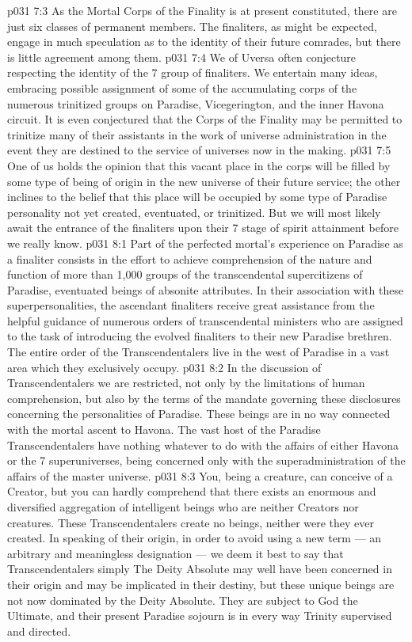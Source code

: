 \vs p031 7:3 \pc As the Mortal Corps of the Finality is at present constituted, there are just six classes of permanent members. The finaliters, as might be expected, engage in much speculation as to the identity of their future comrades, but there is little agreement among them.
\vs p031 7:4 We of Uversa often conjecture respecting the identity of the 7 group of finaliters. We entertain many ideas, embracing possible assignment of some of the accumulating corps of the numerous trinitized groups on Paradise, Vicegerington, and the inner Havona circuit. It is even conjectured that the Corps of the Finality may be permitted to trinitize many of their assistants in the work of universe administration in the event they are destined to the service of universes now in the making.
\vs p031 7:5 One of us holds the opinion that this vacant place in the corps will be filled by some type of being of origin in the new universe of their future service; the other inclines to the belief that this place will be occupied by some type of Paradise personality not yet created, eventuated, or trinitized. But we will most likely await the entrance of the finaliters upon their 7 stage of spirit attainment before we really know.
\vs p031 8:1 Part of the perfected mortal’s experience on Paradise as a finaliter consists in the effort to achieve comprehension of the nature and function of more than 1,000 groups of the transcendental supercitizens of Paradise, eventuated beings of absonite attributes. In their association with these superpersonalities, the ascendant finaliters receive great assistance from the helpful guidance of numerous orders of transcendental ministers who are assigned to the task of introducing the evolved finaliters to their new Paradise brethren. The entire order of the Transcendentalers live in the west of Paradise in a vast area which they exclusively occupy.
\vs p031 8:2 In the discussion of Transcendentalers we are restricted, not only by the limitations of human comprehension, but also by the terms of the mandate governing these disclosures concerning the personalities of Paradise. These beings are in no way connected with the mortal ascent to Havona. The vast host of the Paradise Transcendentalers have nothing whatever to do with the affairs of either Havona or the 7 superuniverses, being concerned only with the superadministration of the affairs of the master universe.
\vs p031 8:3 You, being a creature, can conceive of a Creator, but you can hardly comprehend that there exists an enormous and diversified aggregation of intelligent beings who are neither Creators nor creatures. These Transcendentalers create no beings, neither were they ever created. In speaking of their origin, in order to avoid using a new term --- an arbitrary and meaningless designation --- we deem it best to say that Transcendentalers simply  The Deity Absolute may well have been concerned in their origin and may be implicated in their destiny, but these unique beings are not now dominated by the Deity Absolute. They are subject to God the Ultimate, and their present Paradise sojourn is in every way Trinity supervised and directed.
